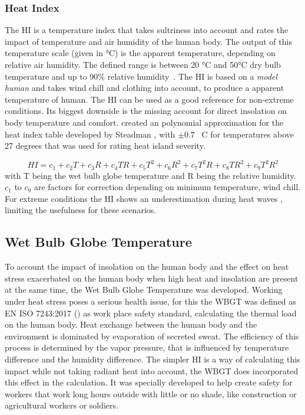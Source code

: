 \documentclass[12pt,a4paper, english,twoside]{scrartcl}
\begin{document}
    \subsubsection{Heat Index}\label{sec:heatIndex}
    The \gls{HI} is a temperature index that takes sultriness into account and rates the impact of temperature and air humidity of the human body. 
    The output of this temperature scale (given in °C) is the apparent temperature, depending on relative air humidity. 
    The defined range is between 20 °C and 50°C dry bulb temperature and up to 90\% relative humidity~\autocite[p. 862]{Steadman1979}. 
    The \gls{HI} is based on a \textit{model human} and takes wind chill and clothing into account, to produce a apparent temperature of human. 
    The \gls{HI} can be used as a good reference for non-extreme conditions. 
    Its biggest downside is the missing account for direct insolation on body temperature and comfort.
    \Cite{Schoen2005} created an polynomial approximation for the heat index table developed by Steadman \autocite{Steadman1979}, with $\pm 0.7$ \textdegree\ C for temperatures above 27 degrees that was used for rating heat island severity.

    \begin{equation}
      HI = c_1 + c_2 T + c_3 R + c_4 T R + c_5 T^2 + c_6 R^2 + c_7 T^2 R + c_8 T R^2 + c_9 T^2 R^2
    \end{equation}
    with T being the wet bulb globe temperature and R being the relative humidity. 
    $c_1$ to $c_9$ are factors for correction depending on minimum temperature, wind chill.
    For extreme conditions the \gls{HI} shows an underestimation during heat waves \autocite{Romps2022}, limiting the usefulness for these scenarios.
  \subsection{Wet Bulb Globe Temperature}
    To account the impact of insolation on the human body and the effect on heat stress exacerbated on the human body when high heat and insolation are present at the same time, the Wet Bulb Globe Temperature was developed. 
    Working under heat stress poses a serious health issue, for this the \gls{WBGT} was defined as EN ISO 7243:2017 (\cite{Iso7243_2017}) as work place safety standard, calculating the thermal load on the human body.
    Heat exchange between the human body and the environment is dominated by evaporation of secreted sweat.
    The efficiency of this process is determined by the vapor pressure, that is influenced by temperature difference and the humidity difference.
    The simpler \gls{HI} is a way of calculating this impact while not taking radiant heat into account, the WBGT does incorporated this effect in the calculation.
    It was specially developed to help create safety for workers that work long hours outside with little or no shade, like construction or agricultural workers or soldiers.
\newpage
\end{document}
